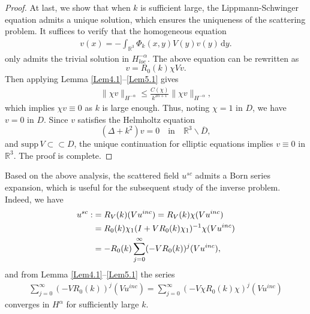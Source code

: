 \documentclass[reqno, 12pt]{amsart}
\numberwithin{equation}{section}
\begin{document}
\begin{proof}
At last, we show that when $k$ is sufficient large, the Lippmann-Schwinger equation admits a unique solution, which ensures the uniqueness of the scattering problem. 
It suffices to verify that the homogeneous equation \begin{align*}
     v(x)=-\int_{\mathbb R^3}\Phi_k(x,y)V(y)v(y)\,\mathrm{d}y.
\end{align*} only admits the trivial solution in $H^{-\alpha}_{loc}$. The above equation can be rewritten as 
\[ v= R_0(k) \chi V v. \]
Then applying Lemma \ref{Lem4.1}--\ref{Lem5.1} gives \begin{align*}
    \|\chi v\|_{H^{-\alpha}} \le \frac{C(\chi)}{k^{2\alpha+1}}\|\chi v\|_{H^{-\alpha}},
\end{align*} which implies $\chi v \equiv 0$ as $k$ is large enough. Thus, noting $\chi=1$ in $D$, we have $v=0 $ in $D$. Since $v$ satisfies the Helmholtz equation 
\[
(\Delta+k^2)v=0 \quad \text{in} \quad \mathbb R^3 \backslash \overline{D},
\]
and $ \text{supp}\,V\subset\subset D$,
 the unique continuation for elliptic equations implies $v \equiv 0$ in $\mathbb R^3$.
The proof is complete.
\end{proof}

Based on the above analysis, the scattered field $u^{sc}$ admits a Born
series expansion, which is useful for the subsequent study of the inverse problem. Indeed, we have \begin{align}\label{bs}
u^{sc}: &=R_{ V}(k)( Vu^{inc}) = R_{ V}(k)\chi(Vu^{inc})\notag\\ &=R_0(k) \chi_1 (I  + VR_0(k)\chi_1)^{-1}\chi( Vu^{inc}) \notag\\ &= -R_0(k)\sum_{j=0}^\infty(-VR_0(k))^j ( Vu^{inc}),
\end{align} 
and from Lemma \ref{Lem4.1}--\ref{Lem5.1} the series \begin{align*}
    \sum_{j=0}^\infty(-  VR_0(k))^j (  Vu^{inc})=\sum_{j=0}^\infty(-  V\chi R_0(k)\chi)^j (Vu^{inc})
\end{align*} converges in $H^\alpha$ for sufficiently large $k$. 
\end{document}
